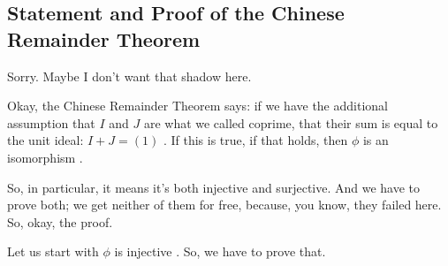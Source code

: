 \subsection{Statement and Proof of the Chinese Remainder Theorem}

\begin{speech}[00:05:25 - 00:06:11]
Sorry. Maybe I don't want that shadow here. 

Okay, the Chinese Remainder Theorem says: if we have the additional assumption that $I$ and $J$ are what we called coprime, that their sum is equal to the unit ideal: $I + J = (1)$ . If this is true, if that holds, then $\phi$ is an isomorphism .

So, in particular, it means it's both injective and surjective. And we have to prove both; we get neither of them for free, because, you know, they failed here. So, okay, the proof. 

Let us start with $\phi$ is injective . So, we have to prove that.
\end{speech}

\begin{content}
\end{content}

\begin{hidden}
\end{hidden}

